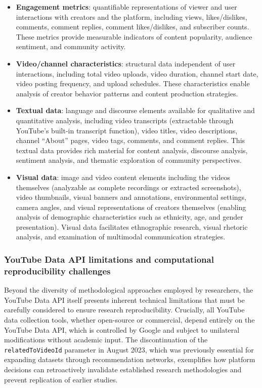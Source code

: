 \begin{itemize}
	\item \textbf{Engagement metrics}: quantifiable representations of viewer and user interactions with creators and the platform, including views, likes/dislikes, comments, comment replies, comment likes/dislikes, and subscriber counts. These metrics provide measurable indicators of content popularity, audience sentiment, and community activity.

	\item \textbf{Video/channel characteristics}: structural data independent of user interactions, including total video uploads, video duration, channel start date, video posting frequency, and upload schedules. These characteristics enable analysis of creator behavior patterns and content production strategies.

	\item \textbf{Textual data}: language and discourse elements available for qualitative and quantitative analysis, including video transcripts (extractable through YouTube's built-in transcript function), video titles, video descriptions, channel \enquote{About} pages, video tags, comments, and comment replies. This textual data provides rich material for content analysis, discourse analysis, sentiment analysis, and thematic exploration of community perspectives.

	\item \textbf{Visual data}: image and video content elements including the videos themselves (analyzable as complete recordings or extracted screenshots), video thumbnails, visual banners and annotations, environmental settings, camera angles, and visual representations of creators themselves (enabling analysis of demographic characteristics such as ethnicity, age, and gender presentation). Visual data facilitates ethnographic research, visual rhetoric analysis, and examination of multimodal communication strategies.
\end{itemize}

\subsubsection{YouTube Data API limitations and computational reproducibility challenges}

Beyond the diversity of methodological approaches employed by researchers, the YouTube Data API itself presents inherent technical limitations that must be carefully considered to ensure research reproducibility. Crucially, all YouTube data collection tools, whether open-source or commercial, depend entirely on the YouTube Data API, which is controlled by Google and subject to unilateral modifications without academic input. The discontinuation of the \texttt{relatedToVideoId} parameter in August 2023, which was previously essential for expanding datasets through recommendation networks, exemplifies how platform decisions can retroactively invalidate established research methodologies and prevent replication of earlier studies.

